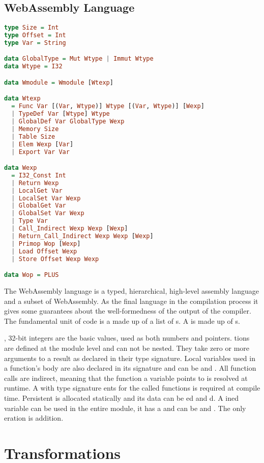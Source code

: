 \subsection{\label{subsection:webdata}WebAssembly Language}
\begin{lstlisting}[language=Haskell]
type Size = Int
type Offset = Int
type Var = String

data GlobalType = Mut Wtype | Immut Wtype
data Wtype = I32

data Wmodule = Wmodule [Wtexp]

data Wtexp
  = Func Var [(Var, Wtype)] Wtype [(Var, Wtype)] [Wexp]
  | TypeDef Var [Wtype] Wtype
  | GlobalDef Var GlobalType Wexp
  | Memory Size
  | Table Size
  | Elem Wexp [Var]
  | Export Var Var

data Wexp
  = I32_Const Int
  | Return Wexp
  | LocalGet Var
  | LocalSet Var Wexp
  | GlobalGet Var
  | GlobalSet Var Wexp
  | Type Var
  | Call_Indirect Wexp Wexp [Wexp]
  | Return_Call_Indirect Wexp Wexp [Wexp]
  | Primop Wop [Wexp]
  | Load Offset Wexp
  | Store Offset Wexp Wexp

data Wop = PLUS
\end{lstlisting}

The WebAssembly language is a typed, hierarchical, high-level assembly language and a subset of WebAssembly. As the final language in the compilation process it gives some guarantees about the well-formedness of the output of the compiler. The fundamental unit of code is a  made up of a list of s. A  is made up of s.

, 32-bit integers are the basic values, used as both numbers and pointers. tions are defined at the module level and can not be nested. They take zero or more arguments to a result as declared in their type signature. Local variables used in a function's body are also declared in its signature and can be  and . All function calls are indirect, meaning that the function a variable points to is resolved at runtime. A  with type signature ents for the called functions is required at compile time. Persistent  is allocated statically and its data can be ed and d. A ined variable can be used in the entire module, it has a  and can be  and . The only eration is addition.

\section{\label{section:transforms}Transformations}
